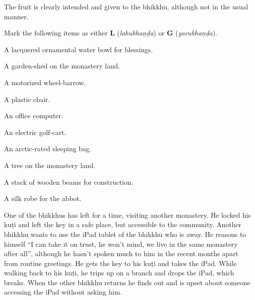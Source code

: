 \begin{exam}{\autoExamName}
\begin{problem}
  \begin{solution}
    The fruit is clearly intended and given to the bhikkhu, although not in the usual manner.
  \end{solution}

\end{problem}

\problemDivide

\begin{problem*}

  Mark the following items as either \textbf{L} (\emph{lahubhaṇḍa}) or \textbf{G} (\emph{garubhaṇḍa}).

  \bigskip

  \begin{parts}
    \item {} A lacquered ornamental water bowl for blessings.
    \bigskip
    \item {} A garden-shed on the monastery land.
    \bigskip
    \item {} A motorized wheel-barrow.
    \bigskip
    \item {} A plastic chair.
    \bigskip
    \item {} An office computer.
    \bigskip
    \item {} An electric golf-cart.
    \bigskip
    \item {} An arctic-rated sleeping bag.
    \bigskip
    \item {} A tree on the monastery land.
    \bigskip
    \item {} A stack of wooden beams for construction.
    \bigskip
    \item {} A silk robe for the abbot.
  \end{parts}

\end{problem*}

\problemDivide

\begin{problem}

  One of the bhikkhus has left for a time, visiting another monastery.
  He locked his kuṭi and left the key in a safe place, but accessible to the community.
  Another bhikkhu wants to use the iPad tablet of the bhikkhu who is away.
  He reasons to himself ``I can take it on trust, he won't mind, we live in the same monastery after all'',
  although he hasn't spoken much to him in the recent months apart from routine greetings.
  He gets the key to his kuṭi and takes the iPad.
  While walking back to his kuṭi, he trips up on a branch and drops the iPad, which breaks.
  When the other bhikkhu returns he finds out and is upset about someone accessing the iPad without asking him.


\end{problem}
\end{exam}

